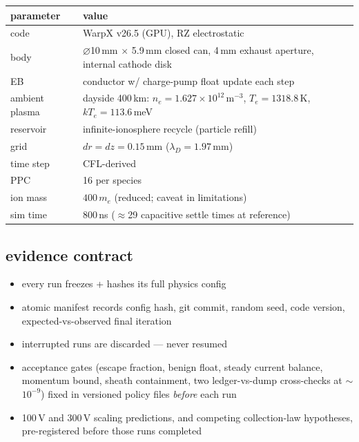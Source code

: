 \documentclass[11pt]{article}
\begin{document}
\begin{center}\small
\begin{tabular}{ll}
\toprule
parameter & value \\
\midrule
code        & WarpX v26.5 (GPU), RZ electrostatic \\
body        & $\varnothing$10\,mm $\times$ 5.9\,mm closed can, 4\,mm exhaust
              aperture, internal cathode disk \\
EB          & conductor w/ charge-pump float update each step \\
ambient plasma & dayside 400\,km: $n_e = 1.627\times10^{12}$\,m$^{-3}$,
                 $T_e = 1318.8$\,K, $kT_e = 113.6$\,meV \\
reservoir   & infinite-ionosphere recycle (particle refill) \\
grid        & $dr = dz = 0.15$\,mm ($\lambda_D = 1.97$\,mm) \\
time step   & CFL-derived \\
PPC         & 16 per species \\
ion mass    & $400\,m_e$ (reduced; caveat in limitations) \\
sim time    & 800\,ns ($\approx$29 capacitive settle times at reference) \\
\bottomrule
\end{tabular}
\end{center}

\subsection{evidence contract}
\begin{itemize}
  \item every run freezes + hashes its full physics config
  \item atomic manifest records config hash, git commit, random seed, code
        version, expected-vs-observed final iteration
  \item interrupted runs are discarded --- never resumed
  \item acceptance gates (escape fraction, benign float, steady current balance,
        momentum bound, sheath containment, two ledger-vs-dump cross-checks at
        $\sim$$10^{-9}$) fixed in versioned policy files \emph{before} each run
  \item 100\,V and 300\,V scaling predictions, and competing collection-law
        hypotheses, pre-registered before those runs completed
\end{itemize}
\end{document}
